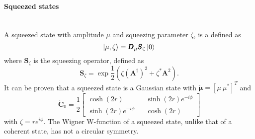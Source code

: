     \paragraph{Squeezed states}\mbox{} \\
    A squeezed state with amplitude $\mu$ and squeezing parameter $\zeta$, is a defined as \cite{}
    \begin{equation}
        \ket{\mu,\zeta}=\pmb{D}_\mu\pmb{S}_\zeta\ket{0}
    \end{equation}
    where $\pmb{S}_\zeta$ is the squeezing operator, defined as
    \begin{equation}
        \pmb{S}_\zeta=\exp{\frac{1}{2}\left(\zeta\left(\pmb{A}^\dagger\right)^2+
        \zeta^*\pmb{A}^2\right)}.
    \end{equation}
    It can be proven that a squeezed state is a Gaussian state with $\check{\pmb{\mu}}=[\mu\ \mu^*]^T$
    and
    \begin{equation*}
        \check{\pmb{C}}_0=\frac{1}{2}
        \begin{bmatrix}
            \cosh(2r) && \sinh(2r)e^{-i\phi}\\
            \sinh(2r)e^{-i\phi} && \cosh(2r)
        \end{bmatrix}
    \end{equation*}
    with $\zeta=re^{i\phi}$.
    The Wigner W-function of a squeezed state, unlike that of a coherent state, has not a 
    circular symmetry.

